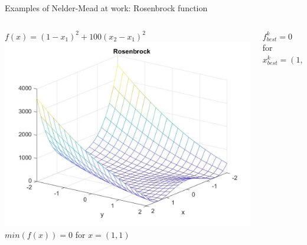 \documentclass{beamer}
\begin{document}
\begin{frame}{Examples of Nelder-Mead at work: Rosenbrock function}
\begin{columns}
\begin{column}{0.49\linewidth}
	$f(x) =(1-x_1)^2 + 100(x_2-x_1)^2$ \\
	\includegraphics[width=0.95\linewidth]{rosenbrockPlotS1} \\
	$min(f(x))= 0 $ for $x = (1,1)$
\end{column}
\begin{column}{0.49\linewidth}
	\begin{figure}
	\end{figure}	
	$f^k_{best}= 0 $ for $x^k_{best}= (1,1)$
\end{column}
\end{columns}
\end{frame}
\end{document}
